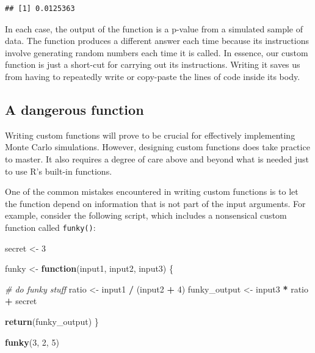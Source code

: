 \documentclass[
]{book}
\newenvironment{Shaded}{\begin{snugshade}}{\end{snugshade}}
\newcommand{\CommentTok}[1]{\textcolor[rgb]{0.56,0.35,0.01}{\textit{#1}}}
\newcommand{\ControlFlowTok}[1]{\textcolor[rgb]{0.13,0.29,0.53}{\textbf{#1}}}
\newcommand{\DecValTok}[1]{\textcolor[rgb]{0.00,0.00,0.81}{#1}}
\newcommand{\FunctionTok}[1]{\textcolor[rgb]{0.13,0.29,0.53}{\textbf{#1}}}
\newcommand{\NormalTok}[1]{#1}
\newcommand{\OtherTok}[1]{\textcolor[rgb]{0.56,0.35,0.01}{#1}}
\newcommand{\SpecialCharTok}[1]{\textcolor[rgb]{0.81,0.36,0.00}{\textbf{#1}}}
\begin{document}
\begin{verbatim}
## [1] 0.0125363
\end{verbatim}

In each case, the output of the function is a p-value from a simulated sample of data. The function produces a different answer each time because its instructions involve generating random numbers each time it is called.
In essence, our custom function is just a short-cut for carrying out its instructions.
Writing it saves us from having to repeatedly write or copy-paste the lines of code inside its body.

\subsection{A dangerous function}\label{a-dangerous-function}

Writing custom functions will prove to be crucial for effectively implementing Monte Carlo simulations.
However, designing custom functions does take practice to master.
It also requires a degree of care above and beyond what is needed just to use R's built-in functions.

One of the common mistakes encountered in writing custom functions is to let the function depend on information that is not part of the input arguments.
For example, consider the following script, which includes a nonsensical custom function called \texttt{funky()}:

\begin{Shaded}
\begin{Highlighting}[]
\NormalTok{secret }\OtherTok{\textless{}{-}} \DecValTok{3}

\NormalTok{funky }\OtherTok{\textless{}{-}} \ControlFlowTok{function}\NormalTok{(input1, input2, input3) \{}
  
  \CommentTok{\# do funky stuff}
\NormalTok{  ratio }\OtherTok{\textless{}{-}}\NormalTok{ input1 }\SpecialCharTok{/}\NormalTok{ (input2 }\SpecialCharTok{+} \DecValTok{4}\NormalTok{)}
\NormalTok{  funky\_output }\OtherTok{\textless{}{-}}\NormalTok{ input3 }\SpecialCharTok{*}\NormalTok{ ratio }\SpecialCharTok{+}\NormalTok{ secret}
  
  \FunctionTok{return}\NormalTok{(funky\_output)  }
\NormalTok{\}}

\FunctionTok{funky}\NormalTok{(}\DecValTok{3}\NormalTok{, }\DecValTok{2}\NormalTok{, }\DecValTok{5}\NormalTok{)}
\end{Highlighting}
\end{Shaded}
\end{document}
